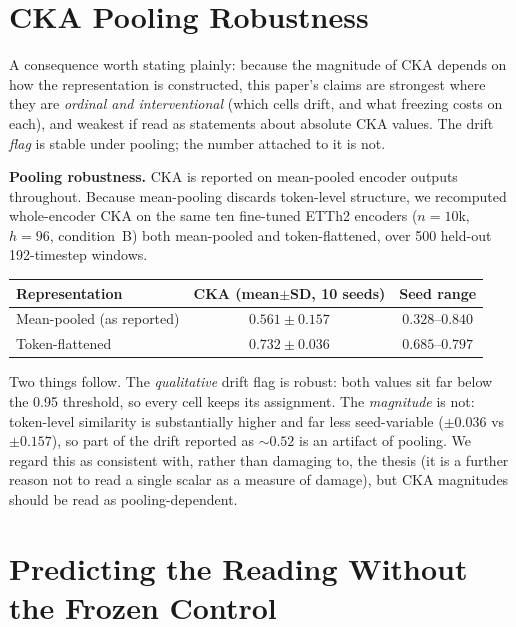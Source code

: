 \documentclass{article}
\begin{document}
\section{CKA Pooling Robustness}
\label{app:pooling}

A consequence worth stating plainly: because the magnitude of CKA depends on how the
representation is constructed, this paper's claims are strongest where they are
\emph{ordinal and interventional} (which cells drift, and what freezing costs on each), and
weakest if read as statements about absolute CKA values. The drift \emph{flag} is stable
under pooling; the number attached to it is not.

\textbf{Pooling robustness.}
CKA is reported on mean-pooled encoder outputs throughout. Because mean-pooling discards
token-level structure, we recomputed whole-encoder CKA on the same ten fine-tuned ETTh2
encoders ($n{=}10$k, $h{=}96$, condition~B) both mean-pooled and token-flattened, over 500
held-out 192-timestep windows.

\begin{center}
\small
\begin{tabular}{@{}lcc@{}}
\toprule
Representation & CKA (mean$\pm$SD, 10 seeds) & Seed range \\
\midrule
Mean-pooled (as reported) & $0.561{\pm}0.157$ & $0.328$--$0.840$ \\
Token-flattened & $0.732{\pm}0.036$ & $0.685$--$0.797$ \\
\bottomrule
\end{tabular}
\end{center}

Two things follow. The \emph{qualitative} drift flag is robust: both values sit far below the
0.95 threshold, so every cell keeps its assignment. The \emph{magnitude} is not: token-level
similarity is substantially higher and far less seed-variable ($\pm0.036$ vs $\pm0.157$), so
part of the drift reported as ${\sim}0.52$ is an artifact of pooling. We regard this as
consistent with, rather than damaging to, the thesis (it is a further reason not to read a
single scalar as a measure of damage), but CKA magnitudes should be read as pooling-dependent.


\section{Predicting the Reading Without the Frozen Control}
\label{app:predictor}
\end{document}
